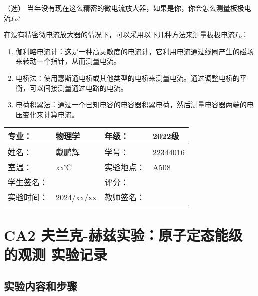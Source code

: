 \documentclass[dvipsnames, svgnames,a4paper,11pt]{article}
\begin{document}
\begin{question}
	（选） 当年没有现在这么精密的微电流放大器，如果是你，你会怎么测量板极电流$I_P$?
\end{question}

	在没有精密微电流放大器的情况下，可以采用以下几种方法来测量板极电流$I_P$：

	\begin{enumerate}
		\item 伽利略电流计：这是一种高灵敏度的电流计，它利用电流通过线圈产生的磁场来转动一个指针，从而测量电流。
		\item 电桥法：使用惠斯通电桥或其他类型的电桥来测量电流。通过调整电桥的平衡，可以间接测量通过电路的电流。
		\item 电荷积累法：通过一个已知电容的电容器积累电荷，然后测量电容器两端的电压变化来计算电流。
	\end{enumerate}



\clearpage
\begin{table}
	\renewcommand\arraystretch{1.7}
	\centering
	\begin{tabularx}{\textwidth}{|X|X|X|X|}
	\hline
	专业：& 物理学 &年级：& 2022级 \\
	\hline
	姓名：& 戴鹏辉 & 学号：& 22344016 \\
	\hline
	室温：& xx℃ & 实验地点： & A508 \\
	\hline
	学生签名：& & 评分： &\\
	\hline
	实验时间：& 2024/xx/xx & 教师签名：&\\
	\hline
	\end{tabularx}
\end{table}

\section{CA2 \quad 夫兰克-赫兹实验：原子定态能级的观测 \quad\heiti 实验记录}
\subsection{实验内容和步骤}
\end{document}
